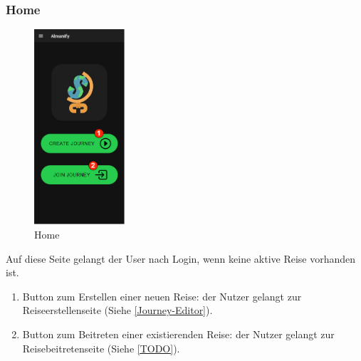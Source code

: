 \subsubsection{Home}\label{Home}
\begin{figure}[H]
    \centering
    \includegraphics[width=0.3\textwidth]{img/pages_numbers/home.drawio}
    \caption[Home]{Home}
    \label{fig:Home}
\end{figure}
Auf diese Seite gelangt der User nach Login, wenn keine aktive Reise vorhanden ist.
\begin{enumerate}[label=\protect\circled{\arabic*}]
	\item Button zum Erstellen einer neuen Reise: der Nutzer gelangt zur Reiseerstellenseite (Siehe \ref{Journey-Editor}).
	\item Button zum Beitreten einer existierenden Reise: der Nutzer gelangt zur Reisebeitretenseite (Siehe \ref{TODO}).
\end{enumerate}

